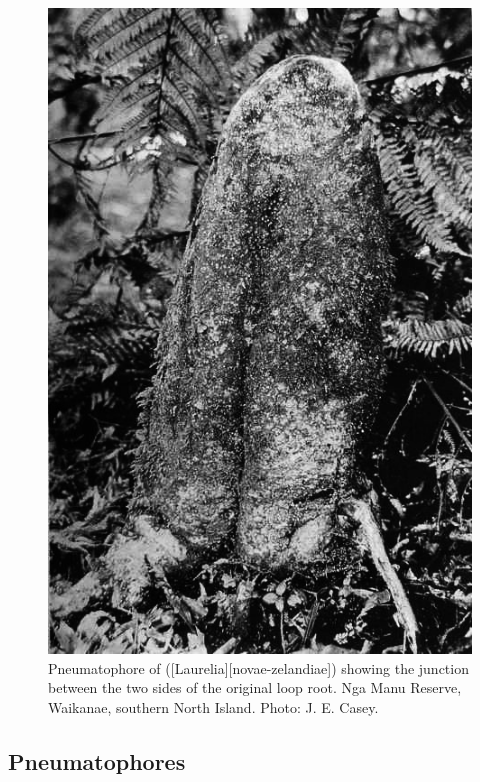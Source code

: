 \begin{figure}[t]
\begin{minipage}[t]{\textwidth}
\begin{minipage}[t]{(\textwidth-\fgap-\fgap) * \real{0.295}}
			\includegraphics[width=\textwidth]{graphics/figure11pukatea.jpg}
			\caption[Pneumatophore of pukatea showing the junction between the two sides of the original loop root]{Pneumatophore of  ([Laurelia][novae-zelandiae]) showing the junction between the two sides of the original loop root.
			Nga Manu Reserve, Waikanae, southern North Island.
			Photo:  J. E. Casey.}%
			\label{fig:11pukatea}
		\end{minipage}
	\end{minipage}
\end{figure}

\subsection{Pneumatophores}

